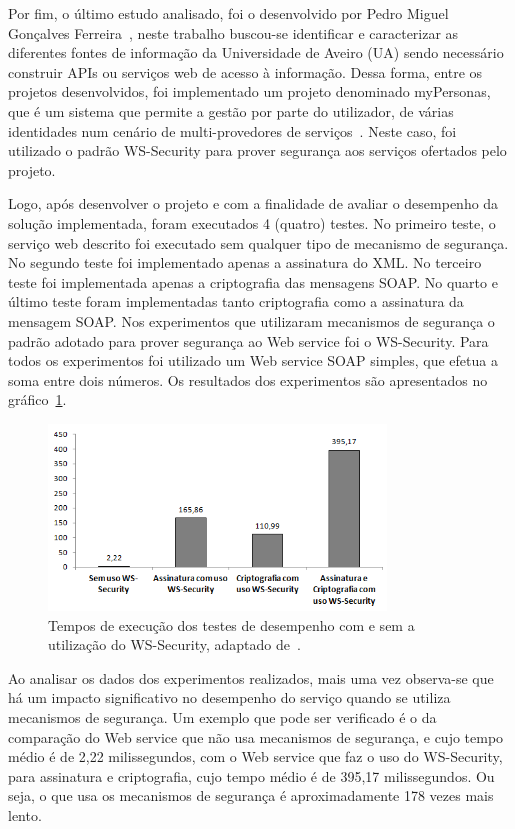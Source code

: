 Por fim, o último estudo analisado, foi o desenvolvido por  Pedro Miguel Gonçalves Ferreira~\cite{pedromiguel2012}, neste trabalho buscou-se identificar e caracterizar as diferentes fontes de informação da Universidade de Aveiro (UA) sendo necessário  construir APIs ou serviços web de acesso à informação. Dessa forma, entre os projetos desenvolvidos, foi implementado um projeto denominado myPersonas, que é um sistema que permite a gestão por parte do utilizador, de várias identidades num cenário de multi-provedores de serviços~\cite{pedromiguel2012}. Neste caso, foi utilizado o padrão WS-Security para prover segurança aos serviços ofertados pelo projeto.

Logo, após desenvolver o projeto e com a finalidade de avaliar o desempenho da solução implementada, foram executados 4 (quatro) testes. No primeiro teste, o serviço web descrito foi executado sem qualquer tipo de mecanismo de segurança. No segundo teste foi implementado apenas a assinatura do XML. No terceiro teste foi implementada apenas a criptografia das mensagens SOAP. No quarto e último teste foram implementadas tanto criptografia como a assinatura da mensagem SOAP. Nos experimentos que utilizaram mecanismos de segurança o padrão adotado para prover segurança ao Web service foi o WS-Security. Para todos os experimentos foi utilizado um Web service SOAP simples, que efetua a soma entre dois números. Os resultados dos experimentos são apresentados no gráfico~\ref{fig:tempowssecurity}.


\begin{figure}[!htb]
    \centering
    \includegraphics[width=0.8\textwidth]{tempo_ws_security.png}
    \caption{Tempos de execução dos testes de desempenho com e sem a utilização do WS-Security, adaptado de~\cite{pedromiguel2012}.}
    \label{fig:tempowssecurity}
\end{figure}

Ao analisar os dados dos experimentos realizados, mais uma vez observa-se que há um impacto significativo no desempenho do serviço quando se utiliza mecanismos de segurança. Um exemplo que pode ser verificado é o da comparação do Web service que não usa mecanismos de segurança, e cujo tempo médio é de 2,22 milissegundos, com o Web service que faz o uso do WS-Security, para assinatura e criptografia, cujo tempo médio é de 395,17 milissegundos. Ou seja, o que usa os mecanismos de segurança é aproximadamente 178 vezes mais lento.

